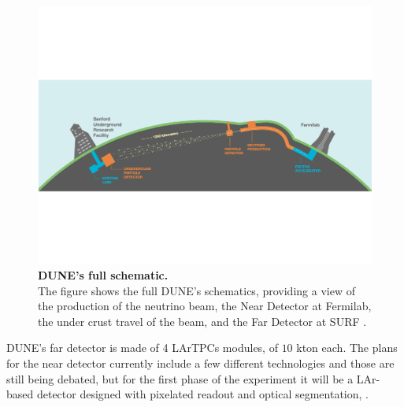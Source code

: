 \begin{figure}
	\begin{center}
		\includegraphics[scale=0.55]{Figures/DUNE_full_schematic.pdf}
		\caption[DUNE's full schematic]{ {\textbf{DUNE's full schematic.}} \\The figure shows the full DUNE's schematics, providing a view of the production of the neutrino beam, the Near Detector at Fermilab, the under crust travel of the beam, and the Far Detector at SURF \cite{DUNE_proposal}.}
		\label{DUNE_full_schematic}	
	\end{center}
\end{figure}

DUNE's far detector is made of 4 LArTPCs modules, of $10$ kton each. The plans for the near detector currently include a few different technologies and those are still being debated, but for the first phase of the experiment it will be a LAr-based detector designed with pixelated readout and optical segmentation, \cite{dune_snowmass_22}.